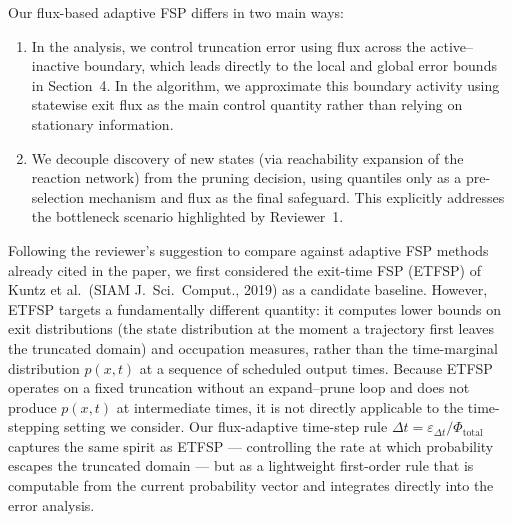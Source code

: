 \documentclass[11pt]{article}
\begin{document}
Our flux-based adaptive FSP differs in two main ways:

\begin{enumerate}
  \item In the analysis, we control truncation error using flux across the
        active--inactive boundary, which leads directly to the local and global
        error bounds in Section~4. In the algorithm, we approximate this boundary
        activity using statewise exit flux as the main control quantity rather
        than relying on stationary information.
  \item We decouple discovery of new states (via reachability expansion of the
        reaction network) from the pruning decision, using quantiles only as a
        pre-selection mechanism and flux as the final safeguard. This explicitly
        addresses the bottleneck scenario highlighted by Reviewer~1.
\end{enumerate}

Following the reviewer's suggestion to compare against adaptive FSP methods already
cited in the paper, we first considered the exit-time FSP (ETFSP) of Kuntz et al.\
(SIAM J.\ Sci.\ Comput., 2019) as a candidate baseline. However, ETFSP targets a
fundamentally different quantity: it computes lower bounds on exit distributions
(the state distribution at the moment a trajectory first leaves the truncated domain)
and occupation measures, rather than the time-marginal distribution $p(x,t)$ at a
sequence of scheduled output times. Because ETFSP operates on a fixed truncation
without an expand--prune loop and does not produce $p(x,t)$ at intermediate times,
it is not directly applicable to the time-stepping setting we consider. Our
flux-adaptive time-step rule $\Delta t = \varepsilon_{\Delta t}/\Phi_{\mathrm{total}}$
captures the same spirit as ETFSP --- controlling the rate at which probability escapes
the truncated domain --- but as a lightweight first-order rule that is computable
from the current probability vector and integrates directly into the error analysis.
\end{document}
